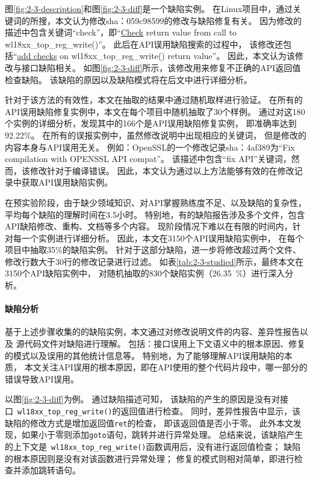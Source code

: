 图\ref{fig:2-3-description}和图\ref{fig:2-3-diff}是一个缺陷实例。
在Linux项目中，通过关键词的所搜，本文认为修改sha：059c98599的修改与缺陷修复有关。
因为修改的描述中包含关键词“check”，即“\underline{Check} return value from call to wl18xx\_top\_reg\_write()”。
此后在API误用缺陷搜索的过程中，
该修改还包括“\underline{add checks} on wl18xx\_top\_reg\_write() return value”。
因此，本文认为该修改与接口缺陷相关。
如图\ref{fig:2-3-diff}所示，该修改用来修复不正确的API返回值检查缺陷。
该缺陷的原因以及缺陷模式将在后文中进行详细分析。

针对于该方法的有效性，本文在抽取的结果中通过随机取样进行验证。
在所有的API误用缺陷修复实例中，本文在每个项目中随机抽取了30个样例。
通过对这180个实例的详细分析，发现其中的166个是API误用缺陷修复实例，
即准确率达到92.22\%。
在所有的误报实例中，虽然修改说明中出现相应的关键词，
但是修改的内容本身与API误用无关。
例如：OpenSSL的一个修改记录sha：4af389为“Fix compilation with OPENSSL API compat”。
该描述中包含“fix API”关键词，然而，该修改针对于编译错误。
因此，本文认为通过以上方法能够有效的在修改记录中获取API误用缺陷实例。


在预实验阶段，由于缺少领域知识、对API掌握熟练度不足、以及缺陷的复杂性，
平均每个缺陷的理解时间在3.5小时。
特别地，有的缺陷报告涉及多个文件，包含API缺陷修改、重构、文档等多个内容。
现阶段情况下难以在有限的时间内，针对每一个实例进行详细分析。
因此，本文在3150个API误用缺陷实例中，
在每个项目中抽取35\%的缺陷实例。
针对于这部分缺陷，进一步将修改超过两个文件、修改行数大于30行的修改记录进行过滤。
如表\ref{tab:2-3-studied}所示，最终本文在3150个API缺陷实例中，
对随机抽取的830个缺陷实例（26.35~\%）进行深入分析。

\paragraph{缺陷分析}
基于上述步骤收集的的缺陷实例，本文通过对修改说明文件的内容、差异性报告以及
源代码文件对缺陷进行理解。
包括：接口误用上下文语义中的根本原因、修复的模式以及误用的其他统计信息等。
特别地，为了能够理解API误用缺陷的本质，
本文关注API误用的根本原因，即在API使用的整个代码片段中，哪一部分的错误导致API误用。

以图\ref{fig:2-3-diff}为例。
通过缺陷描述可知，
该缺陷的产生的原因是没有对接口~\texttt{wl18xx\_top\_reg\_write()}的返回值进行检查。
同时，差异性报告中显示，该缺陷的修改方式是增加返回值\texttt{ret}的检查，
即该返回值是否小于零。
此外本文发现，如果小于零则添加\texttt{goto}语句，跳转并进行异常处理。
总结来说，该缺陷产生的上下文是~\texttt{wl18xx\_top\_reg\_write()}函数调用后，没有进行返回值检查；
缺陷的根本原因则是没有对该函数进行异常处理；
修复的模式则相对简单，即进行检查并添加跳转语句。

